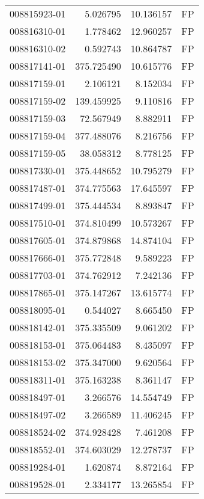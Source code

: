 \begin{tabular}{lrrl}
008815923-01 &    5.026795 &      10.136157 &   FP \\
008816310-01 &    1.778462 &      12.960257 &   FP \\
008816310-02 &    0.592743 &      10.864787 &   FP \\
008817141-01 &  375.725490 &      10.615776 &   FP \\
008817159-01 &    2.106121 &       8.152034 &   FP \\
008817159-02 &  139.459925 &       9.110816 &   FP \\
008817159-03 &   72.567949 &       8.882911 &   FP \\
008817159-04 &  377.488076 &       8.216756 &   FP \\
008817159-05 &   38.058312 &       8.778125 &   FP \\
008817330-01 &  375.448652 &      10.795279 &   FP \\
008817487-01 &  374.775563 &      17.645597 &   FP \\
008817499-01 &  375.444534 &       8.893847 &   FP \\
008817510-01 &  374.810499 &      10.573267 &   FP \\
008817605-01 &  374.879868 &      14.874104 &   FP \\
008817666-01 &  375.772848 &       9.589223 &   FP \\
008817703-01 &  374.762912 &       7.242136 &   FP \\
008817865-01 &  375.147267 &      13.615774 &   FP \\
008818095-01 &    0.544027 &       8.665450 &   FP \\
008818142-01 &  375.335509 &       9.061202 &   FP \\
008818153-01 &  375.064483 &       8.435097 &   FP \\
008818153-02 &  375.347000 &       9.620564 &   FP \\
008818311-01 &  375.163238 &       8.361147 &   FP \\
008818497-01 &    3.266576 &      14.554749 &   FP \\
008818497-02 &    3.266589 &      11.406245 &   FP \\
008818524-02 &  374.928428 &       7.461208 &   FP \\
008818552-01 &  374.603029 &      12.278737 &   FP \\
008819284-01 &    1.620874 &       8.872164 &   FP \\
008819528-01 &    2.334177 &      13.265854 &   FP \\

\end{tabular}
